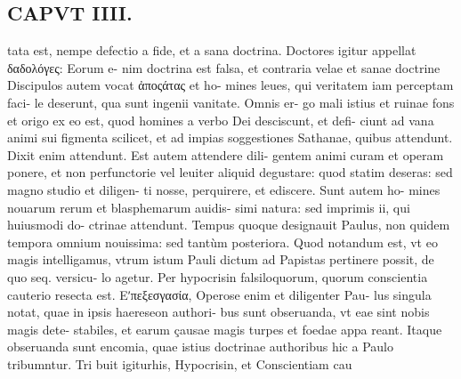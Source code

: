 \documentclass{article}
\begin{document}
\begin{pages}
\section*{CAPVT  IIII. }
\marginpar{[ p.185 ]}\pstart tata est, nempe defectio a fide, et a sana doctrina. Doctores igitur appellat δαδολόγες: Eorum e- nim doctrina est falsa, et contraria velae et sanae doctrine Discipulos autem vocat ἀποςάτας et ho- mines leues, qui veritatem iam perceptam faci- le deserunt, qua sunt ingenii vanitate. Omnis er- go mali istius et ruinae fons et origo ex eo est, quod homines a verbo Dei desciscunt, et defi- ciunt ad vana animi sui figmenta scilicet, et ad impias soggestiones Sathanae, quibus attendunt. Dixit enim attendunt. Est autem attendere dili- gentem animi curam et operam ponere, et non perfunctorie vel leuiter aliquid degustare: quod statim deseras: sed magno studio et diligen- ti nosse, perquirere, et ediscere. Sunt autem ho- mines nouarum rerum et blasphemarum auidis- simi natura: sed imprimis ii, qui huiusmodi do- ctrinae attendunt. Tempus quoque designauit Paulus, non quidem tempora omnium nouissima: sed tantùm posteriora. Quod notandum est, vt eo magis intelligamus, vtrum istum Pauli dictum ad Papistas pertinere possit, de quo seq. versicu- lo agetur.  \pend{} Per hypocrisin falsiloquorum, quorum conscientia cauterio resecta est.  \pend\pstart Εʹπεξεσγασία, Operose enim et diligenter Pau- lus singula notat, quae in ipsis haereseon authori- bus sunt obseruanda, vt eae sint nobis magis dete- stabiles, et earum çausae magis turpes et foedae appa reant. Itaque obseruanda sunt encomia, quae istius doctrinae authoribus hic a Paulo tribumntur. Tri buit igiturhis, Hypocrisin, et Conscientiam cau  \pend

\end{pages}
\end{document}
